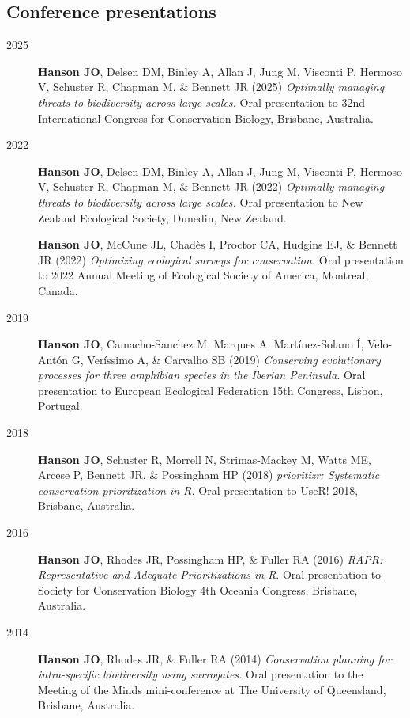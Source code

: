 \documentclass[12pt,a4paper]{article}
\begin{document}
\subsection*{Conference presentations}
\begin{description}

\item[2025] \textbf{Hanson JO}, Delsen DM, Binley A, Allan J, Jung M, Visconti P, Hermoso V, Schuster R, Chapman M, \& Bennett JR (2025) \textit{Optimally managing threats to biodiversity across large scales.} Oral presentation to 32nd International Congress for Conservation Biology, Brisbane, Australia.

\item[2022] \textbf{Hanson JO}, Delsen DM, Binley A, Allan J, Jung M, Visconti P, Hermoso V, Schuster R, Chapman M, \& Bennett JR (2022) \textit{Optimally managing threats to biodiversity across large scales.} Oral presentation to New Zealand Ecological Society, Dunedin, New Zealand.

\textbf{Hanson JO}, McCune JL, Chadès I, Proctor CA, Hudgins EJ, \& Bennett JR (2022) \textit{Optimizing ecological surveys for conservation.} Oral presentation to 2022 Annual Meeting of Ecological Society of America, Montreal, Canada.

\item[2019] \textbf{Hanson JO}, Camacho-Sanchez M, Marques A, Martínez-Solano Í, Velo-Antón G, Veríssimo A, \& Carvalho SB (2019) \textit{Conserving evolutionary processes for three amphibian species in the Iberian Peninsula.} Oral presentation to European Ecological Federation 15th Congress, Lisbon, Portugal.

\item[2018] \textbf{Hanson JO}, Schuster R, Morrell N, Strimas-Mackey M, Watts ME, Arcese P, Bennett JR, \& Possingham HP (2018) \textit{prioritizr: Systematic conservation prioritization in R.} Oral presentation to UseR! 2018, Brisbane, Australia.

\item[2016] \textbf{Hanson JO}, Rhodes JR, Possingham HP, \& Fuller RA (2016) \textit{RAPR: Representative and Adequate Prioritizations in R}. Oral presentation to Society for Conservation Biology 4th Oceania Congress, Brisbane, Australia.

\item[2014] \textbf{Hanson JO}, Rhodes JR, \& Fuller RA (2014) \textit{Conservation planning for intra-specific biodiversity using surrogates.} Oral presentation to the Meeting of the Minds mini-conference at The University of Queensland, Brisbane, Australia.

\end{description}
\end{document}
